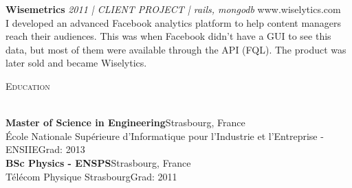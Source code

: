 \documentclass[a4paper]{article}
\newcommand{\lineunder} {
    \vspace*{-8pt} \\
    \hspace*{-18pt} \hrulefill \\
}
\newcommand{\header} [1] {
    {\hspace*{-18pt}\vspace*{6pt} \textsc{#1}}
    \vspace*{-6pt} \lineunder
}
\begin{document}
{\textbf{Wisemetrics} \sl 2011 | CLIENT PROJECT | rails, mongodb} \hfill www.wiselytics.com\\
I developed an advanced Facebook analytics platform to help content managers reach their audiences.
This was when Facebook didn't have a GUI to see this data, but most of them were available through the API (FQL).
The product was later sold and became Wiselytics.\\
\vspace*{2mm}

\header{Education}
\vspace{1mm}

\textbf{Master of Science in Engineering}\hfill Strasbourg, France\\
École Nationale Supérieure d'Informatique pour l'Industrie et l'Entreprise - ENSIIE\hfill Grad: 2013\\
\vspace{2mm}
\textbf{BSc Physics - ENSPS}\hfill Strasbourg, France\\
Télécom Physique Strasbourg\hfill Grad: 2011\\
\vspace{2mm}

\vspace*{2mm}

\ 
\end{document}

